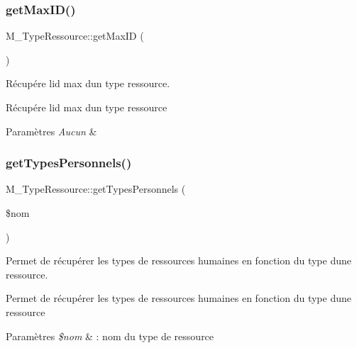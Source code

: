 \subsubsection{\texorpdfstring{get\+Max\+I\+D()}{getMaxID()}}
{\footnotesize\ttfamily M\+\_\+\+Type\+Ressource\+::get\+Max\+ID (\begin{DoxyParamCaption}{ }\end{DoxyParamCaption})}



Récupére l\textquotesingle{}id max d\textquotesingle{}un type ressource. 

Récupére l\textquotesingle{}id max d\textquotesingle{}un type ressource 
\begin{DoxyParams}{Paramètres}
{\em Aucun} & \\
\hline
\end{DoxyParams}
\mbox{\label{class_m___type_ressource_a3c28369308cbb0f32f3b6c1496710a66}} 
\subsubsection{\texorpdfstring{get\+Types\+Personnels()}{getTypesPersonnels()}}
{\footnotesize\ttfamily M\+\_\+\+Type\+Ressource\+::get\+Types\+Personnels (\begin{DoxyParamCaption}\item[{}]{\$nom }\end{DoxyParamCaption})}



Permet de récupérer les types de ressources humaines en fonction du type d\textquotesingle{}une ressource. 

Permet de récupérer les types de ressources humaines en fonction du type d\textquotesingle{}une ressource 
\begin{DoxyParams}{Paramètres}
{\em \$nom} & \+: nom du type de ressource \\
\hline
\end{DoxyParams}
\mbox{\label{class_m___type_ressource_a6ce2e48c018e8d6113171e0f963c4a0a}} 
